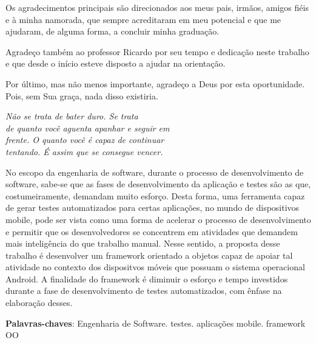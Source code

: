 \documentclass[
    12pt,       %
    openright,      %
    twoside,      %
    a4paper,      %
    english,      %
    french,       %
    spanish,      %
    brazil,       %
    ]{abntex2}
\begin{document}
  \begin{agradecimentos}
  Os agradecimentos principais são direcionados aos meus pais, irmãos,
  amigos fiéis e à minha namorada, que sempre acreditaram em meu potencial
  e que me ajudaram, de alguma forma, a concluir minha graduação.

  Agradeço também ao professor Ricardo por seu tempo e dedicação neste trabalho e que desde o início esteve disposto a ajudar na orientação.

  Por último, mas não menos importante, agradeço a Deus por esta oportunidade. Pois, sem Sua graça, nada disso existiria.

  \end{agradecimentos}

  \begin{epigrafe}
      \vspace*{\fill}
    \begin{flushright}
      \textit{Não se trata de bater duro. Se trata \\
       de quanto você aguenta apanhar e seguir em \\
       frente. O quanto você é capaz de continuar \\
       tentando. É assim que se consegue vencer.}
    \end{flushright}
  \end{epigrafe}


  \begin{resumo}
    No escopo da engenharia de software, durante o processo de desenvolvimento
    de software, sabe-se que as fases de desenvolvimento da aplicação e testes são as que,
    costumeiramente, demandam muito esforço. Desta forma, uma ferramenta capaz
    de gerar testes automatizados para certas aplicações, no mundo de
    dispositivos mobile, pode ser vista como uma forma de acelerar o processo de
    desenvolvimento e permitir que os desenvolvedores se concentrem em
    atividades que demandem mais inteligência do que trabalho manual. Nesse
    sentido, a proposta desse trabalho é desenvolver um framework orientado
    a objetos capaz de apoiar tal atividade no contexto dos dispositvos móveis
    que possuam o sistema operacional Android. A finalidade do framework é diminuir
    o esforço e tempo investidos durante a fase de desenvolvimento de testes automatizados,
    com ênfase na elaboração desses.

   \vspace{\onelineskip}

   \noindent
   \textbf{Palavras-chaves}: Engenharia de Software. testes. aplicações mobile.
   framework OO
  \end{resumo}
\end{document}
